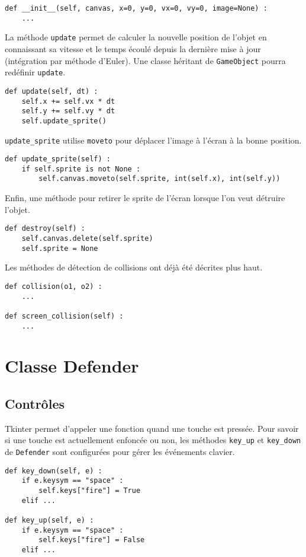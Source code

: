 \documentclass[12pt]{article}
\newcommand{\pagesection}{\newpage\section}
\begin{document}
\begin{verbatim}
def __init__(self, canvas, x=0, y=0, vx=0, vy=0, image=None) :
	...
\end{verbatim}


La méthode \texttt{update} permet de calculer la nouvelle position de l'objet en connaissant sa vitesse et le temps écoulé depuis la dernière mise à jour (intégration par méthode d'Euler). Une classe héritant de \texttt{GameObject} pourra redéfinir \texttt{update}.

\begin{verbatim}
def update(self, dt) :
	self.x += self.vx * dt
	self.y += self.vy * dt
	self.update_sprite()
\end{verbatim}

\texttt{update\_sprite} utilise \texttt{moveto} pour déplacer l'image à l'écran à la bonne position.

\begin{verbatim}
def update_sprite(self) :
	if self.sprite is not None :
		self.canvas.moveto(self.sprite, int(self.x), int(self.y))
\end{verbatim}

Enfin, une méthode pour retirer le sprite de l'écran lorsque l'on veut détruire l'objet.
\begin{verbatim}
def destroy(self) :
	self.canvas.delete(self.sprite)
	self.sprite = None
\end{verbatim}

Les méthodes de détection de collisions ont déjà été décrites plus haut.
\begin{verbatim}
def collision(o1, o2) :
	...

def screen_collision(self) :
	...
\end{verbatim}






\pagesection{Classe Defender}

	\subsection{Contrôles}
	Tkinter permet d'appeler une fonction quand une touche est pressée. Pour savoir si une touche est actuellement enfoncée ou non, les méthodes \texttt{key\_up} et \texttt{key\_down} de \texttt{Defender} sont configurées pour gérer les événements clavier.

\begin{verbatim}
def key_down(self, e) :
	if e.keysym == "space" :
		self.keys["fire"] = True
	elif ...

def key_up(self, e) :
	if e.keysym == "space" :
		self.keys["fire"] = False
	elif ...
\end{verbatim}
\end{document}
